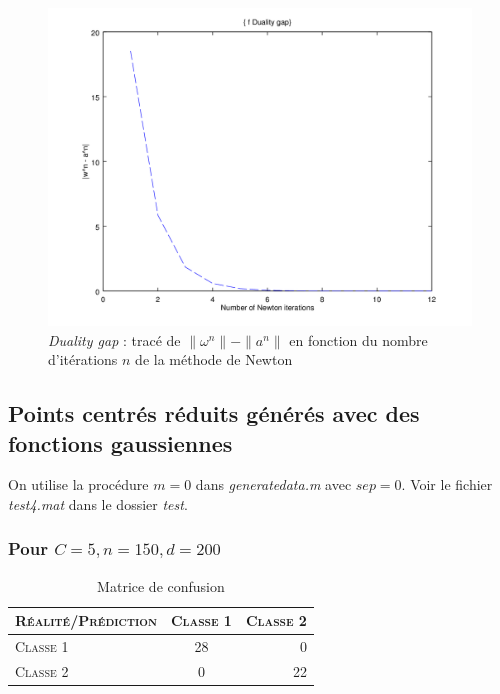 \documentclass{article}
\begin{document}
         \begin{figure}
           \begin{center}
             \includegraphics[scale=0.5]{images/duality3.png}
             \caption{\emph{Duality gap} : tracé de $\|\omega^n\| - \|a^n\|$ en fonction du nombre d'itérations $n$ de la méthode de Newton}
           \end{center}
         \end{figure}


\subsection{Points centrés réduits générés avec des fonctions gaussiennes}

On utilise la procédure $m=0$ dans \emph{generatedata.m} avec $sep=0$. Voir le fichier \emph{test4.mat} dans le dossier \emph{test}. 

\subsubsection{Pour $C=5, n=150, d=200$}

     \begin{table}[H]
       \caption{Matrice de confusion}
       \begin{tabular}{|l|c|r|}
         \hline
         \textsc{Réalité/Prédiction} & \textsc{Classe 1} & \textsc{Classe 2}\\
         \hline
         \textsc{Classe 1} & 28 & 0\\
         \hline
         \textsc{Classe 2} & 0 & 22\\
         \hline
       \end{tabular}
     \end{table}
\end{document}
